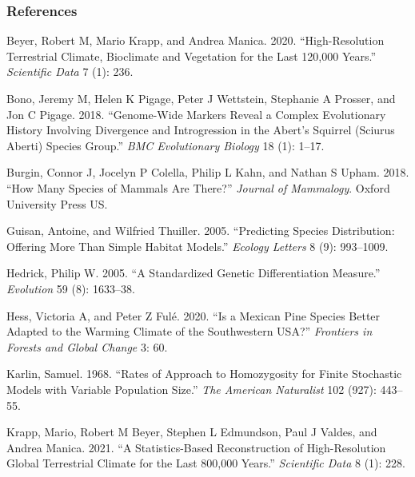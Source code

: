 \documentclass[
]{article}
\newlength{\cslhangindent}
\newlength{\cslentryspacingunit} %
\newenvironment{CSLReferences}[2] %
 {%
  \setlength{\parindent}{0pt}
  \ifodd #1
  \let\oldpar\par
  \def\par{\hangindent=\cslhangindent\oldpar}
  \fi
  \setlength{\parskip}{#2\cslentryspacingunit}
 }%
 {}
\begin{document}
\hypertarget{references}{%
\subsubsection*{References}\label{references}}

\hypertarget{refs}{}
\begin{CSLReferences}{1}{0}
\leavevmode{}%
Beyer, Robert M, Mario Krapp, and Andrea Manica. 2020.
{``High-Resolution Terrestrial Climate, Bioclimate and Vegetation for
the Last 120,000 Years.''} \emph{Scientific Data} 7 (1): 236.

\leavevmode{}%
Bono, Jeremy M, Helen K Pigage, Peter J Wettstein, Stephanie A Prosser,
and Jon C Pigage. 2018. {``Genome-Wide Markers Reveal a Complex
Evolutionary History Involving Divergence and Introgression in the
Abert's Squirrel (Sciurus Aberti) Species Group.''} \emph{BMC
Evolutionary Biology} 18 (1): 1--17.

\leavevmode{}%
Burgin, Connor J, Jocelyn P Colella, Philip L Kahn, and Nathan S Upham.
2018. {``How Many Species of Mammals Are There?''} \emph{Journal of
Mammalogy}. Oxford University Press US.

\leavevmode{}%
Guisan, Antoine, and Wilfried Thuiller. 2005. {``Predicting Species
Distribution: Offering More Than Simple Habitat Models.''} \emph{Ecology
Letters} 8 (9): 993--1009.

\leavevmode{}%
Hedrick, Philip W. 2005. {``A Standardized Genetic Differentiation
Measure.''} \emph{Evolution} 59 (8): 1633--38.

\leavevmode{}%
Hess, Victoria A, and Peter Z Fulé. 2020. {``Is a Mexican Pine Species
Better Adapted to the Warming Climate of the Southwestern USA?''}
\emph{Frontiers in Forests and Global Change} 3: 60.

\leavevmode{}%
Karlin, Samuel. 1968. {``Rates of Approach to Homozygosity for Finite
Stochastic Models with Variable Population Size.''} \emph{The American
Naturalist} 102 (927): 443--55.

\leavevmode{}%
Krapp, Mario, Robert M Beyer, Stephen L Edmundson, Paul J Valdes, and
Andrea Manica. 2021. {``A Statistics-Based Reconstruction of
High-Resolution Global Terrestrial Climate for the Last 800,000
Years.''} \emph{Scientific Data} 8 (1): 228.


\end{CSLReferences}
\end{document}
